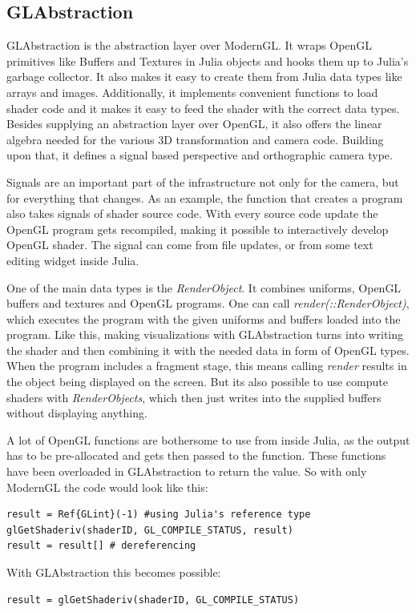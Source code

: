 \subsection{GLAbstraction}
GLAbstraction is the abstraction layer over ModernGL.
It wraps \ac{OpenGL} primitives like Buffers and Textures in Julia objects and hooks them up to Julia's garbage collector. It also makes it easy to create them from Julia data types like arrays and images.
Additionally, it implements convenient functions to load shader code and it makes it easy to feed the shader with the correct data types.
Besides supplying an abstraction layer over \ac{OpenGL}, it also offers the linear algebra needed for the various 3D transformation and camera code.
Building upon that, it defines a signal based perspective and orthographic camera type.

Signals are an important part of the infrastructure not only for the camera, but for everything that changes.
As an example, the function that creates a program also takes signals of shader source code. 
With every source code update the OpenGL program gets recompiled, making it possible to interactively develop OpenGL shader. The signal can come from file updates, or from some text editing widget inside Julia.

One of the main data types is the \textit{RenderObject}.
It combines uniforms, OpenGL buffers and textures and OpenGL programs. One can call \textit{render(::RenderObject)}, which executes the program with the given uniforms and buffers loaded into the program. 
Like this, making visualizations with GLAbstraction turns into writing the shader and then combining it with the needed data in form of OpenGL types.
When the program includes a fragment stage, this means calling \textit{render} results in the object being displayed on the screen. But its also possible to use compute shaders with \textit{RenderObjects}, which then just writes into the supplied buffers without displaying anything.

A lot of OpenGL functions are bothersome to use from inside Julia, as the output has to be pre-allocated and gets then passed to the function.
These functions have been overloaded in GLAbstraction to return the value.
So with only ModernGL the code would look like this:
\begin{lstlisting}
result = Ref{GLint}(-1) #using Julia's reference type
glGetShaderiv(shaderID, GL_COMPILE_STATUS, result)
result = result[] # dereferencing
\end{lstlisting}
With GLAbstraction this becomes possible:
\begin{lstlisting}
result = glGetShaderiv(shaderID, GL_COMPILE_STATUS)
\end{lstlisting}

